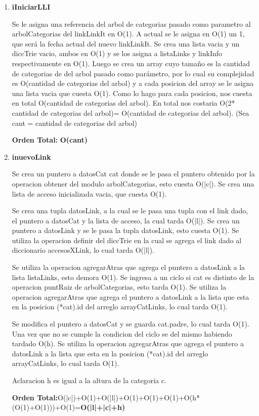 \begin{enumerate}
\item\textbf{iIniciarLLI}
\par Se le asigna una referencia del arbol de categorias pasado como parametro al arbolCategorias del linkLinkIt en O(1). A actual se le asigna en O(1) un 1, que será la fecha actual del nuevo linkLinkIt. Se crea una lista vacia y un diccTrie vacio, ambos en O(1) y se los asigna a listaLinks y linkInfo respectivamente en O(1). Luego se crea un array cuyo tamaño es la cantidad de categorias de del arbol pasado como parámetro, por lo cual su complejidad es O(cantidad de categorias del arbol) y a cada posicion del array se le asigna una lista vacia que cuesta O(1). Como lo hago para cada posicion, nos cuesta en total O(cantidad de categorias del arbol). En total nos costaria O(2* cantidad de categorias del arbol)= O(cantidad de categorias del arbol). (Sea cant = cantidad de categorias del arbol)
\par\textbf{Orden Total:} \textbf{O(cant)}

\item\textbf{inuevoLink}
\par Se crea un puntero a datosCat cat donde se le pasa el puntero obtenido por la operacion obtener del modulo arbolCategorias, esto cuesta O(|c|). Se crea una lista de acceso  inicializada vacia, que cuesta O(1).
\par Se crea una tupla datosLink, a la cual se le pasa una tupla con el link dado, el puntero a datosCat y la lista de acceso, la cual tarda O(|l|). Se crea un puntero a datosLink y se le pasa la tupla datosLink, esto cuesta O(1).  Se utiliza la operacion definir del diccTrie en la cual se agrega el link dado al diccionario accesosXLink, lo cual tarda O(|l|).
\par Se utiliza la operacion agregarAtras que agrega el puntero a datosLink a la lista listaLinks, esto demora O(1).  Se ingresa a un ciclo si cat es distinto de la operacion puntRaiz de arbolCategorias, esto tarda O(1). Se utiliza la operacion agregarAtras que agrega el puntero a datosLink a la lista que esta en la posicion (*cat).id del arreglo arrayCatLinks, lo cual tarda O(1).
\par Se modifica el puntero a datosCat y se guarda cat.padre, lo cual tarda O(1). Una vez que no se cumple la condicion del ciclo se del mismo habiendo tardado O(h). Se utiliza la operacion agregarAtras que agrega el puntero a datosLink a la lista que esta en la posicion (*cat).id del arreglo arrayCatLinks, lo cual tarda O(1).
\par Aclaracion h es igual a la altura de la categoria c.
\par\textbf{Orden Total:}O(|c|)+O(1)+O(|l|)+O(1)+O(1)+O(1)+O(h*(O(1)+O(1)))+O(1)=\textbf{O(|l|+|c|+h)}


\end{enumerate}
